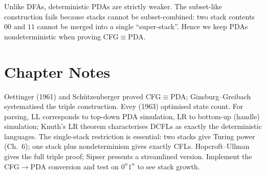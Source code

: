 \begin{remark}
Unlike DFAs, deterministic PDAs are strictly weaker. The subset-like construction fails because stacks cannot be subset-combined: two stack contents $00$ and $11$ cannot be merged into a single ``super-stack''. Hence we keep PDAs nondeterministic when proving CFG$\equiv$PDA.
\end{remark}

\section{Chapter Notes}
Oettinger (1961) and Sch\"utzenberger proved CFG$\equiv$PDA; Ginsburg--Greibach systematised the triple construction. Evey (1963) optimised state count.
For parsing, LL corresponds to top-down PDA simulation, LR to bottom-up (handle) simulation; Knuth's LR theorem characterises DCFLs as exactly the deterministic languages.
The single-stack restriction is essential: two stacks give Turing power (Ch.~6); one stack plus nondeterminism gives exactly CFLs.
Hopcroft--Ullman gives the full triple proof; Sipser presents a streamlined version. Implement the CFG$\to$PDA conversion and test on $0^n1^n$ to see stack growth.

